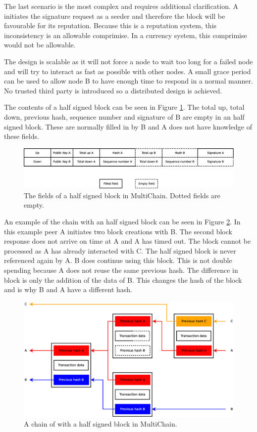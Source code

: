 The last scenario is the most complex and requires additional clarification.
A initiates the signature request as a seeder and therefore the block will be favourable for its reputation.
Because this is a reputation system, this inconsistency is an allowable comprimise.
In a currency system, this comprimise would not be allowable.

The design is scalable as it will not force a node to wait too long for a failed node
and will try to interact as fast as possible with other nodes.
A small grace period can be used to allow node B to have enough time to respond in a normal manner.
No trusted third party is introduced so a distributed design is achieved.

The contents of a half signed block can be seen in Figure \ref{fig:halfsigned-block}.
The total up, total down, previous hash, sequence number and signature of B are empty in an half signed block.
These are normally filled in by B and A does not have knowledge of these fields.

\begin{figure}
	\centerline{\includegraphics[scale=0.3]{design/figs/halfsigned-block.eps}}
	\caption{The fields of a half signed block in MultiChain. Dotted fields are empty.}
	\label{fig:halfsigned-block}
\end{figure}

An example of the chain with an half signed block can be seen in Figure \ref{fig:halfsigned-chain}.
In this example peer A initiates two block creations with B.
The second block response does not arrive on time at A and A has timed out.
The block cannot be processed as A has already interacted with C.
The half signed block is never referenced again by A.
B does continue using this block.
This is not double spending because A does not reuse the same previous hash.
The difference in block is only the addition of the data of B.
This changes the hash of the block and is why B and A have a different hash.

\begin{figure}
	\centerline{\includegraphics[scale=0.3]{design/figs/halfsigned-chain.eps}}
	\caption{A chain of with a half signed block in MultiChain.}
	\label{fig:halfsigned-chain}
\end{figure}

